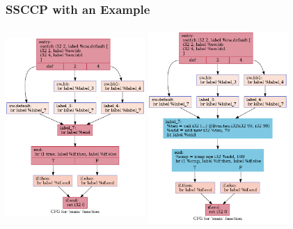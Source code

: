 \documentclass{beamer}
\begin{document}
\begin{frame}
	\frametitle{SSCCP with an Example}
	\includegraphics[width=5.3cm,height=7.5cm]{SCCP_BASELINE.dot.png}
	\includegraphics[width=5.3cm,height=7.5cm]{specSCCP_HPSSA.dot.png}
\end{frame}
\end{document}
